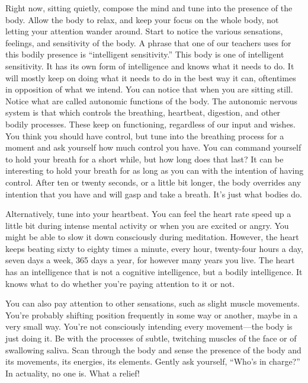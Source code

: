 Right now, sitting quietly, compose the mind and tune into the presence of the body. Allow the body to relax, and keep your focus on the whole body, not letting your attention wander around. Start to notice the various sensations, feelings, and sensitivity of the body. A phrase that one of our teachers uses for this bodily presence is ``intelligent sensitivity.'' This body is one of intelligent sensitivity. It has its own form of intelligence and knows what it needs to do. It will mostly keep on doing what it needs to do in the best way it can, oftentimes in opposition of what we intend. You can notice that when you are sitting still. Notice what are called autonomic functions of the body. The autonomic nervous system is that which controls the breathing, heartbeat, digestion, and other bodily processes. These keep on functioning, regardless of our input and wishes. You think you should have control, but tune into the breathing process for a moment and ask yourself how much control you have. You can command yourself to hold your breath for a short while, but how long does that last? It can be interesting to hold your breath for as long as you can with the intention of having control. After ten or twenty seconds, or a little bit longer, the body overrides any intention that you have and will gasp and take a breath. It's just what bodies do.

Alternatively, tune into your heartbeat. You can feel the heart rate speed up a little bit during intense mental activity or when you are excited or angry. You might be able to slow it down consciously during meditation. However, the heart keeps beating sixty to eighty times a minute, every hour, twenty-four hours a day, seven days a week, 365 days a year, for however many years you live. The heart has an intelligence that is not a cognitive intelligence, but a bodily intelligence. It knows what to do whether you're paying attention to it or not.

You can also pay attention to other sensations, such as slight muscle movements. You're probably shifting position frequently in some way or another, maybe in a very small way. You're not consciously intending every movement---the body is just doing it. Be with the processes of subtle, twitching muscles of the face or of swallowing saliva. Scan through the body and sense the presence of the body and its movements, its energies, its elements. Gently ask yourself, ``Who's in charge?'' In actuality, no one is. What a relief!

